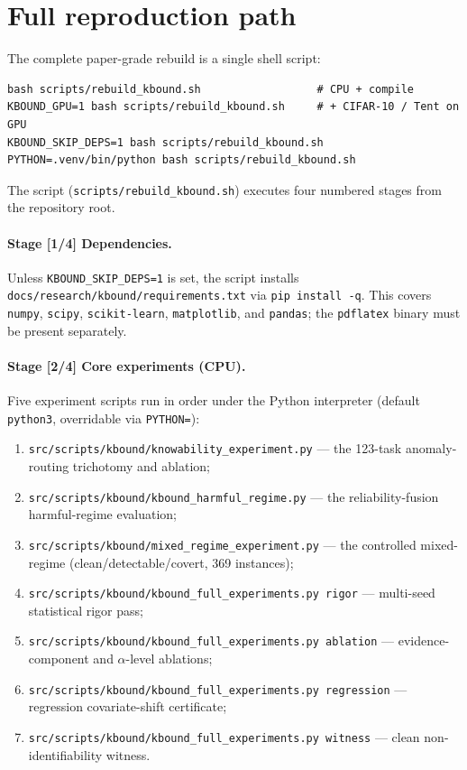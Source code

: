 \section{Full reproduction path}
\label{sec:app-repro-rebuild}

The complete paper-grade rebuild is a single shell script:

\begin{verbatim}
bash scripts/rebuild_kbound.sh                  # CPU + compile
KBOUND_GPU=1 bash scripts/rebuild_kbound.sh     # + CIFAR-10 / Tent on GPU
KBOUND_SKIP_DEPS=1 bash scripts/rebuild_kbound.sh
PYTHON=.venv/bin/python bash scripts/rebuild_kbound.sh
\end{verbatim}

The script (\texttt{scripts/rebuild\_kbound.sh}) executes four numbered stages
from the repository root.

\paragraph{Stage [1/4] Dependencies.}
Unless \texttt{KBOUND\_SKIP\_DEPS=1} is set, the script installs
\texttt{docs/research/kbound/requirements.txt} via \texttt{pip install -q}.
This covers \texttt{numpy}, \texttt{scipy}, \texttt{scikit-learn},
\texttt{matplotlib}, and \texttt{pandas}; the \texttt{pdflatex} binary must be
present separately.

\paragraph{Stage [2/4] Core experiments (CPU).}
Five experiment scripts run in order under the Python interpreter (default
\texttt{python3}, overridable via \texttt{PYTHON=}):

\begin{enumerate}
  \item \texttt{src/scripts/kbound/knowability\_experiment.py} --- the
    123-task anomaly-routing trichotomy and ablation;
  \item \texttt{src/scripts/kbound/kbound\_harmful\_regime.py} --- the
    reliability-fusion harmful-regime evaluation;
  \item \texttt{src/scripts/kbound/mixed\_regime\_experiment.py} --- the
    controlled mixed-regime (clean/detectable/covert, 369 instances);
  \item \texttt{src/scripts/kbound/kbound\_full\_experiments.py rigor} ---
    multi-seed statistical rigor pass;
  \item \texttt{src/scripts/kbound/kbound\_full\_experiments.py ablation} ---
    evidence-component and $\alpha$-level ablations;
  \item \texttt{src/scripts/kbound/kbound\_full\_experiments.py regression} ---
    regression covariate-shift certificate;
  \item \texttt{src/scripts/kbound/kbound\_full\_experiments.py witness} ---
    clean non-identifiability witness.
\end{enumerate}

